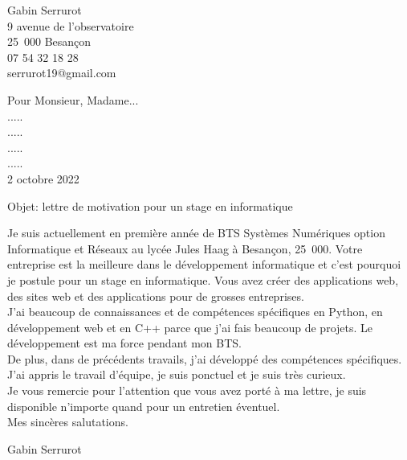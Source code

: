 \documentclass[11pt,a4paper,openany]{book}
\begin{document}
\thispagestyle{empty}

\begin{flushleft}
Gabin Serrurot\\
9 avenue de l'observatoire\\
25~000 Besançon\\
07 54 32 18 28\\
serrurot19@gmail.com\newline
\end{flushleft}

\medskip

\begin{flushright}
Pour Monsieur, Madame...\\
.....\\
.....\\
.....\\
.....\\
2 octobre 2022\\
\end{flushright}

\medskip

\begin{flushleft}
Objet: lettre de motivation pour un stage en informatique \newline
\end{flushleft}

Je suis actuellement en première année de BTS Systèmes Numériques option Informatique et Réseaux au lycée Jules Haag à Besançon, 25~000. Votre entreprise est la meilleure dans le développement informatique et c'est pourquoi je postule pour un stage en informatique. \newline
Vous avez créer des applications web, des sites web et des applications pour de grosses entreprises.\\
J'ai beaucoup de connaissances et de compétences spécifiques en Python, en développement web et en C++ parce que j'ai fais beaucoup de projets. Le développement est ma force pendant mon BTS.\\
De plus, dans de précédents travails, j'ai développé des compétences spécifiques. J'ai appris le travail d'équipe, je suis ponctuel et je suis très curieux.\\

Je vous remercie pour l'attention que vous avez porté à ma lettre, je suis disponible n'importe quand pour un entretien éventuel.\\

Mes sincères salutations.\\

\begin{flushright}
Gabin Serrurot
\end{flushright}
\end{document}
